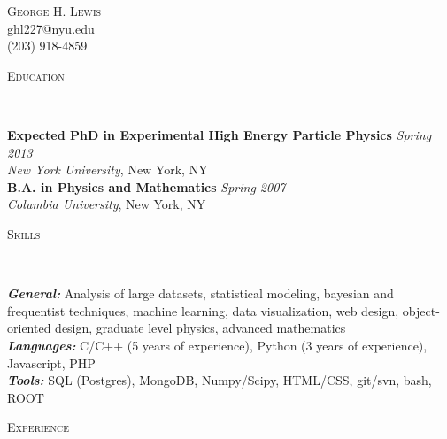 \documentclass[9pt]{article}
\newenvironment{changemargin}[2]{%
  \begin{list}{}{%
    \setlength{\topsep}{0pt}%
    \setlength{\leftmargin}{#1}%
    \setlength{\rightmargin}{#2}%
    \setlength{\listparindent}{\parindent}%
    \setlength{\itemindent}{\parindent}%
    \setlength{\parsep}{\parskip}%
  }%
  \item[]}{\end{list}
}
\newcommand{\lineover}{
	\begin{changemargin}{-0.05in}{-0.05in}
		\vspace*{-8pt}
		\hrulefill \\
		\vspace*{-2pt}
	\end{changemargin}
}
\newcommand{\header}[1]{
	\begin{changemargin}{-0.5in}{-0.5in}
		\scshape{#1}\\
  	\lineover
	\end{changemargin}
}
\newcommand{\contact}[4]{
	\begin{changemargin}{-0.5in}{-0.5in}
		\begin{center}
			{\Large \scshape {#1}}\\ \smallskip
			{#2}\\ \smallskip 
			{#3}\\ \smallskip
			{#4}\smallskip
		\end{center}
	\end{changemargin}
}
\newenvironment{body} {
	\vspace*{-16pt}
	\begin{changemargin}{-0.25in}{-0.5in}
  }	
	{\end{changemargin}
}
\begin{document}
\contact{George H. Lewis}{ghl227@nyu.edu}{(203) 918-4859}
\smallskip


\header{Education}

\begin{body}
	\vspace{14pt}
	\textbf{Expected PhD in Experimental High Energy Particle Physics }{} \hfill \emph{Spring 2013}{} \\
	\emph{New York University}, New York, NY{} \\
  \medskip
	\textbf{B.A. in Physics and Mathematics} \hfill \emph{Spring 2007} \\
	\emph{Columbia University}, New York, NY\\
\end{body}

\smallskip


\header{Skills}

\begin{body}
	\vspace{14pt}
        \emph{\textbf{General:}}{} Analysis of large datasets, statistical modeling, bayesian and frequentist techniques, machine learning, data visualization, web design, object-oriented design, graduate level physics, advanced mathematics \\
        \smallskip
	\emph{\textbf{Languages:}}{} C/C++ (5 years of experience),  Python (3 years of experience), Javascript, PHP \\
        \smallskip
        \emph{\textbf{Tools:}}{} SQL (Postgres), MongoDB, Numpy/Scipy, HTML/CSS, git/svn, bash, ROOT \\
\end{body}

\smallskip

\header{Experience}
\end{document}
